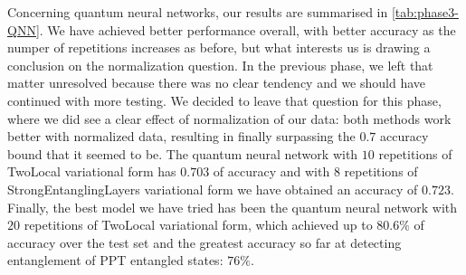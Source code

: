Concerning quantum neural networks, our results are summarised in \autoref{tab:phase3-QNN}. We have achieved better performance overall, with better accuracy as the numper of repetitions increases as before, but what interests us is drawing a conclusion on the normalization question. In the previous phase, we left that matter unresolved because there was no clear tendency and we should have continued with more testing. We decided to leave that question for this phase, where we did see a clear effect of normalization of our data: both methods work better with normalized data, resulting in finally surpassing the $0.7$ accuracy bound that it seemed to be. The quantum neural network with $10$ repetitions of TwoLocal variational form has $0.703$ of accuracy and with $8$ repetitions of StrongEntanglingLayers variational form we have obtained an accuracy of $0.723$. Finally, the best model we have tried has been the quantum neural network with $20$ repetitions of TwoLocal variational form, which achieved up to $80.6\%$ of accuracy over the test set and the greatest accuracy so far at detecting entanglement of PPT entangled states: $76\%$. 



